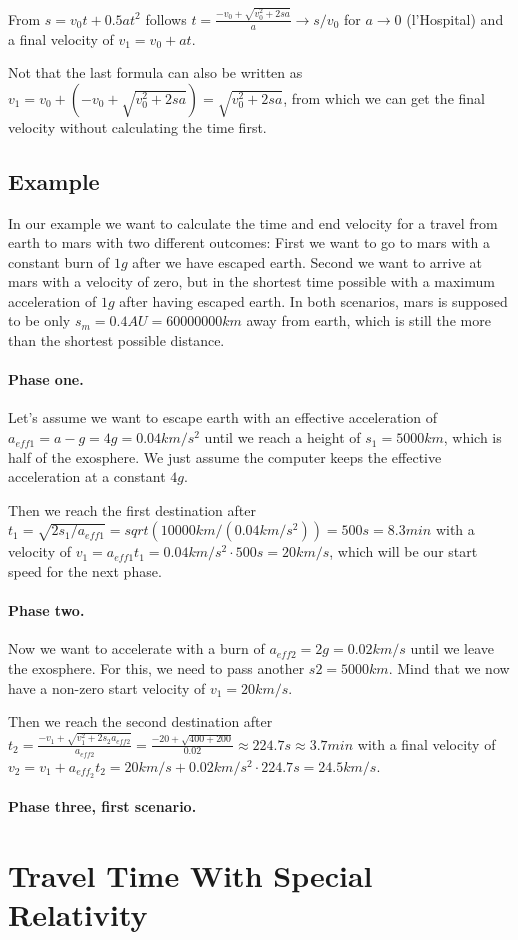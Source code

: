 \documentclass[10pt]{article}
\begin{document}
	From $s = v_0t + 0.5at^2$ follows $t = \frac{-v_0 + \sqrt{v^2_0 + 2sa}}{a} \rightarrow s/v_0$ for $a\rightarrow0$ (l'Hospital) and a final velocity of $v_1 = v_0 + at$.
	
	Not that the last formula can also be written as $v_1=v_0 + (-v_0 + \sqrt{v^2_0+2sa}) = \sqrt{v^2_0+2sa}$, from which we can get the final velocity without calculating the time first.
	
	\subsection{Example}
	
	In our example we want to calculate the time and end velocity for a travel from earth to mars with two different outcomes: First we want to go to mars with a constant burn of $1g$ after we have escaped earth. Second we want to arrive at mars with a velocity of zero, but in the shortest time possible with a maximum acceleration of $1g$ after having escaped earth. In both scenarios, mars is supposed to be only $s_m = 0.4 AU = 60 000 000 km$ away from earth, which is still the more than the shortest possible distance.
	
	\paragraph{Phase one.}
	Let's assume we want to escape earth with an effective acceleration of $a_{eff1} = a-g = 4g = 0.04 km/s^2$ until we reach a height of $s_1=5000 km$, which is half of the exosphere. We just assume the computer keeps the effective acceleration at a constant $4g$.
	
	Then we reach the first destination after $t_1 = \sqrt{2s_1/a_{eff1}} = sqrt(10000km/(0.04km/s^2)) = 500 s = 8.3 min$ with a velocity of $v_1=a_{eff1}t_1=0.04km/s^2\cdot 500s = 20 km/s$, which will be our start speed for the next phase.
	
	\paragraph{Phase two.}
	Now we want to accelerate with a burn of $a_{eff2}=2g=0.02km/s$ until we leave the exosphere. For this, we need to pass another $s2=5000km$. Mind that we now have a non-zero start velocity of $v_1 = 20 km/s$.
	
	Then we reach the second destination after $t_2 = \frac{-v_1+\sqrt{v^2_1+2s_2a_{eff2}}}{a_{eff2}} =\frac{-20+\sqrt{400+200}}{0.02} \approx 224.7 s \approx 3.7 min $ with a final velocity of $v_2 = v_1 + a_{eff_2}t_2 = 20 km/s + 0.02 km/s^2\cdot 224.7 s = 24.5 km/s$.
	
	\paragraph{Phase three, first scenario.}
	
	\section{Travel Time With Special Relativity}
\end{document}
